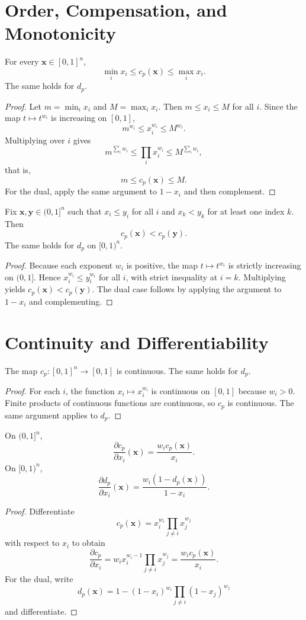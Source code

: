 \documentclass[11pt]{article}
\begin{document}
\section{Order, Compensation, and Monotonicity}
\begin{theorem}
For every $\mathbf{x}\in[0,1]^n$,
\[
\min_i x_i \le c_p(\mathbf{x}) \le \max_i x_i.
\]
The same holds for $d_p$.
\end{theorem}
\begin{proof}
Let $m=\min_i x_i$ and $M=\max_i x_i$. Then $m\le x_i\le M$ for all $i$. Since the map $t\mapsto t^{w_i}$ is increasing on $[0,1]$,
\[
 m^{w_i} \le x_i^{w_i} \le M^{w_i}.
\]
Multiplying over $i$ gives
\[
 m^{\sum_i w_i} \le \prod_i x_i^{w_i} \le M^{\sum_i w_i},
\]
that is,
\[
 m \le c_p(\mathbf{x}) \le M.
\]
For the dual, apply the same argument to $1-x_i$ and then complement.
\end{proof}

\begin{theorem}
Fix $\mathbf{x},\mathbf{y}\in(0,1]^n$ such that $x_i\le y_i$ for all $i$ and $x_k<y_k$ for at least one index $k$. Then
\[
 c_p(\mathbf{x}) < c_p(\mathbf{y}).
\]
The same holds for $d_p$ on $[0,1)^n$.
\end{theorem}
\begin{proof}
Because each exponent $w_i$ is positive, the map $t\mapsto t^{w_i}$ is strictly increasing on $(0,1]$. Hence $x_i^{w_i}\le y_i^{w_i}$ for all $i$, with strict inequality at $i=k$. Multiplying yields $c_p(\mathbf{x})<c_p(\mathbf{y})$. The dual case follows by applying the argument to $1-x_i$ and complementing.
\end{proof}

\section{Continuity and Differentiability}
\begin{proposition}[Continuity]
The map $c_p:[0,1]^n\to[0,1]$ is continuous. The same holds for $d_p$.
\end{proposition}
\begin{proof}
For each $i$, the function $x_i\mapsto x_i^{w_i}$ is continuous on $[0,1]$ because $w_i>0$. Finite products of continuous functions are continuous, so $c_p$ is continuous. The same argument applies to $d_p$.
\end{proof}

\begin{proposition}
On $(0,1]^n$,
\[
\frac{\partial c_p}{\partial x_i}(\mathbf{x}) = \frac{w_i c_p(\mathbf{x})}{x_i}.
\]
On $[0,1)^n$,
\[
\frac{\partial d_p}{\partial x_i}(\mathbf{x}) = \frac{w_i(1-d_p(\mathbf{x}))}{1-x_i}.
\]
\end{proposition}
\begin{proof}
Differentiate
\[
 c_p(\mathbf{x}) = x_i^{w_i}\prod_{j\ne i} x_j^{w_j}
\]
with respect to $x_i$ to obtain
\[
\frac{\partial c_p}{\partial x_i} = w_i x_i^{w_i-1}\prod_{j\ne i}x_j^{w_j} = \frac{w_i c_p(\mathbf{x})}{x_i}.
\]
For the dual, write
\[
 d_p(\mathbf{x}) = 1 - (1-x_i)^{w_i}\prod_{j\ne i}(1-x_j)^{w_j}
\]
and differentiate.
\end{proof}
\end{document}
